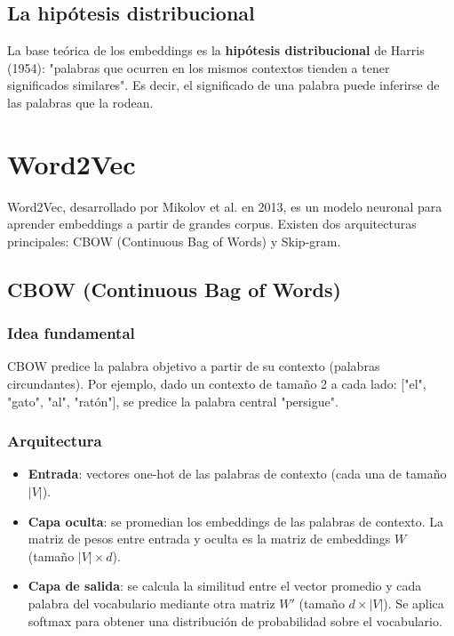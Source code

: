 \documentclass[12pt,a4paper,openany,oneside]{book}
\begin{document}
\subsection{La hipótesis distribucional}
La base teórica de los embeddings es la \textbf{hipótesis distribucional} de Harris (1954): "palabras que ocurren en los mismos contextos tienden a tener significados similares". Es decir, el significado de una palabra puede inferirse de las palabras que la rodean.

\section{Word2Vec}

Word2Vec, desarrollado por Mikolov et al. en 2013, es un modelo neuronal para aprender embeddings a partir de grandes corpus. Existen dos arquitecturas principales: CBOW (Continuous Bag of Words) y Skip-gram.

\subsection{CBOW (Continuous Bag of Words)}
\subsubsection{Idea fundamental}
CBOW predice la palabra objetivo a partir de su contexto (palabras circundantes). Por ejemplo, dado un contexto de tamaño 2 a cada lado: ["el", "gato", "al", "ratón"], se predice la palabra central "persigue".

\subsubsection{Arquitectura}
\begin{itemize}
    \item \textbf{Entrada}: vectores one-hot de las palabras de contexto (cada una de tamaño \(|V|\)).
    \item \textbf{Capa oculta}: se promedian los embeddings de las palabras de contexto. La matriz de pesos entre entrada y oculta es la matriz de embeddings \(W\) (tamaño \(|V| \times d\)).
    \item \textbf{Capa de salida}: se calcula la similitud entre el vector promedio y cada palabra del vocabulario mediante otra matriz \(W'\) (tamaño \(d \times |V|\)). Se aplica softmax para obtener una distribución de probabilidad sobre el vocabulario.
\end{itemize}
\end{document}
